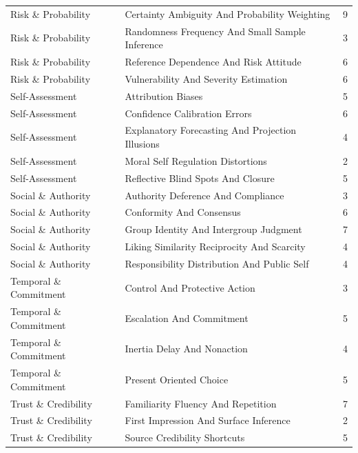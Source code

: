 \begin{longtable}{p{}p{}r}
Risk \& Probability & Certainty Ambiguity And Probability Weighting & 9 \\
Risk \& Probability & Randomness Frequency And Small Sample Inference & 3 \\
Risk \& Probability & Reference Dependence And Risk Attitude & 6 \\
Risk \& Probability & Vulnerability And Severity Estimation & 6 \\
Self-Assessment & Attribution Biases & 5 \\
Self-Assessment & Confidence Calibration Errors & 6 \\
Self-Assessment & Explanatory Forecasting And Projection Illusions & 4 \\
Self-Assessment & Moral Self Regulation Distortions & 2 \\
Self-Assessment & Reflective Blind Spots And Closure & 5 \\
Social \& Authority & Authority Deference And Compliance & 3 \\
Social \& Authority & Conformity And Consensus & 6 \\
Social \& Authority & Group Identity And Intergroup Judgment & 7 \\
Social \& Authority & Liking Similarity Reciprocity And Scarcity & 4 \\
Social \& Authority & Responsibility Distribution And Public Self & 4 \\
Temporal \& Commitment & Control And Protective Action & 3 \\
Temporal \& Commitment & Escalation And Commitment & 5 \\
Temporal \& Commitment & Inertia Delay And Nonaction & 4 \\
Temporal \& Commitment & Present Oriented Choice & 5 \\
Trust \& Credibility & Familiarity Fluency And Repetition & 7 \\
Trust \& Credibility & First Impression And Surface Inference & 2 \\
Trust \& Credibility & Source Credibility Shortcuts & 5 \\
\end{longtable}
